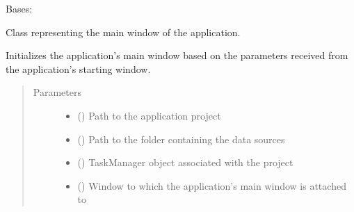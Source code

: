 \documentclass[letterpaper,10pt,english]{sphinxmanual}
\begin{document}
\begin{fulllineitems}
\label{\detokenize{gui_main_window:src.graphical_user_interface.main_window.MainWindow}}
\sphinxAtStartPar
Bases: 

\sphinxAtStartPar
Class representing the main window of the application.

\begin{fulllineitems}
\label{\detokenize{gui_main_window:src.graphical_user_interface.main_window.MainWindow.__init__}}
\sphinxAtStartPar
Initializes the application’s main window based on the parameters received
from the application’s starting window.
\begin{quote}\begin{description}
\item[{Parameters}] \leavevmode\begin{itemize}
\item {} 
\sphinxAtStartPar
{} () \textendash{} Path to the application project

\item {} 
\sphinxAtStartPar
{} () \textendash{} Path to the folder containing the data sources

\item {} 
\sphinxAtStartPar
{} () \textendash{} TaskManager object associated with the project

\item {} 
\sphinxAtStartPar
{} () \textendash{} Window to which the application’s main window is attached to


\end{itemize}
\end{description}
\end{quote}
\end{fulllineitems}
\end{fulllineitems}
\end{document}
